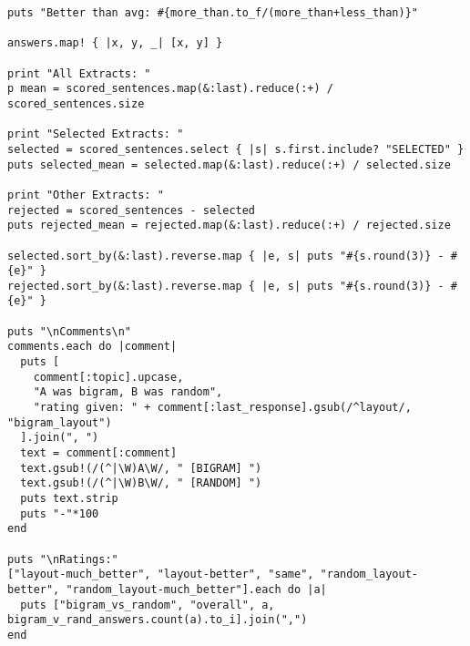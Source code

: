 \documentclass{article}
\begin{document}
\begin{verbatim}
puts "Better than avg: #{more_than.to_f/(more_than+less_than)}"

answers.map! { |x, y, _| [x, y] }

print "All Extracts: "
p mean = scored_sentences.map(&:last).reduce(:+) / scored_sentences.size

print "Selected Extracts: "
selected = scored_sentences.select { |s| s.first.include? "SELECTED" }
puts selected_mean = selected.map(&:last).reduce(:+) / selected.size

print "Other Extracts: "
rejected = scored_sentences - selected
puts rejected_mean = rejected.map(&:last).reduce(:+) / rejected.size

selected.sort_by(&:last).reverse.map { |e, s| puts "#{s.round(3)} - #{e}" }
rejected.sort_by(&:last).reverse.map { |e, s| puts "#{s.round(3)} - #{e}" }

puts "\nComments\n"
comments.each do |comment|
  puts [
    comment[:topic].upcase,
    "A was bigram, B was random",
    "rating given: " + comment[:last_response].gsub(/^layout/, "bigram_layout")
  ].join(", ")
  text = comment[:comment]
  text.gsub!(/(^|\W)A\W/, " [BIGRAM] ")
  text.gsub!(/(^|\W)B\W/, " [RANDOM] ")
  puts text.strip
  puts "-"*100
end

puts "\nRatings:"
["layout-much_better", "layout-better", "same", "random_layout-better", "random_layout-much_better"].each do |a|
  puts ["bigram_vs_random", "overall", a, bigram_v_rand_answers.count(a).to_i].join(",")
end


\end{verbatim}
\pagebreak
\end{document}
